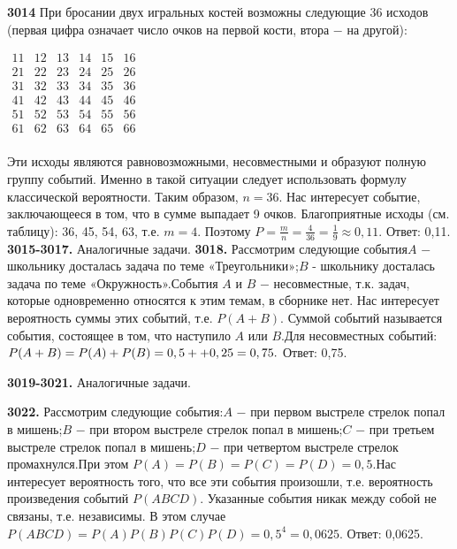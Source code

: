 \textbf{3014} При бросании двух игральных костей возможны следующие 36 исходов (первая цифра означает число очков на первой кости, втора $-$ на другой):
\begin{center}$
\begin{matrix}
11& 12& 13& 14& 15& 16&\\
21& 22& 23& 24& 25& 26&\\
31& 32& 33& 34& 35& 36&\\
41& 42& 43& 44& 45& 46&\\
51& 52& 53& 54& 55& 56&\\
61& 62& 63& 64& 65& 66&\\
\end{matrix}$
\end{center}
Эти исходы являются равновозможными, несовместными и образуют полную группу событий. Именно в такой ситуации следует использовать формулу классической вероятности. Таким образом, $n=36.$
Нас интересует событие, заключающееся в том, что в сумме выпадает 9 очков. Благоприятные исходы (см. таблицу): 36, 45, 54, 63, т.е. $m=4$. Поэтому $P = \frac{m}{n}=\frac{4}{36}=\frac{1}{9}\approx0,11.$ \newline \null \hspace*{\fill} Ответ: 0,11. \newline
\textbf{3015-3017.} Аналогичные задачи.\newline
\textbf{3018.} Рассмотрим следующие события\newline$A$ $-$ школьнику досталась задача по теме «Треугольники»;\newline$B$ - школьнику досталась задача по теме «Окружность».\newline События $A$ и $B$ $-$ несовместные, т.к. задач, которые одновременно относятся к этим темам, в сборнике нет. Нас интересует вероятность суммы этих событий, т.е. $P(A+B)$. Суммой событий называется события, состоящее в том, что наступило $A$ или $B$.\newline Для несовместных событий: $P(A+B)=P(A)+P(B)=0,5+\linebreak+0,25=0,75.$\null \hspace*{\fill} Ответ: 0,75. 

\textbf{3019-3021.} Аналогичные задачи.

\textbf{3022.} Рассмотрим следующие события:\newline $A$ $-$ при первом выстреле стрелок попал в мишень;\newline$B$ $-$ при втором выстреле стрелок попал в мишень;\newline$C$ $-$ при третьем выстреле стрелок попал в мишень;\newline$D$ $-$ при четвертом выстреле стрелок промахнулся.\newline При этом $P(A)=P(B)=P(C)=P(D)=0,5.$\newline Нас интересует вероятность того, что все эти события произошли, т.е. вероятность произведения событий $P(ABCD)$. Указанные события никак между собой не связаны, т.е. независимы. В этом случае $P(ABCD)=P(A)P(B)P(C)P(D)=0,5^4=0,0625.$ \newline \null \hspace*{\fill} Ответ: 0,0625. 


